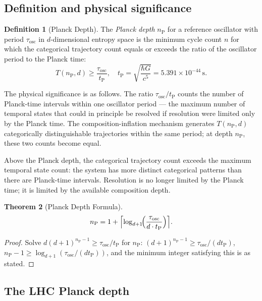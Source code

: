 \documentclass[twocolumn,10pt,a4paper]{article}
\theoremstyle{thmstyle}
\newtheorem{theorem}{Theorem}[section]
\theoremstyle{definition}
\newtheorem{definition}[theorem]{Definition}
\theoremstyle{remark}
\newcommand{\tP}{t_{\mathrm{P}}}
\newcommand{\nP}{n_{\mathrm{P}}}
\begin{document}
\subsection{Definition and physical significance}

\begin{definition}[Planck Depth]
\label{def:planckdepth}
The \emph{Planck depth} $\nP$ for a reference oscillator with period
$\tau_{\mathrm{osc}}$ in $d$-dimensional entropy space is the minimum cycle
count $n$ for which the categorical trajectory count equals or exceeds the
ratio of the oscillator period to the Planck time:
\begin{equation}
T(\nP, d) \geq \frac{\tau_{\mathrm{osc}}}{\tP},
\quad \tP = \sqrt{\frac{\hbar G}{c^5}} = 5.391 \times 10^{-44}\,\mathrm{s}.
\label{eq:planck_def}
\end{equation}
\end{definition}

The physical significance is as follows. The ratio $\tau_{\mathrm{osc}}/\tP$
counts the number of Planck-time intervals within one oscillator period —
the maximum number of temporal states that could in principle be resolved
if resolution were limited only by the Planck time. The composition-inflation
mechanism generates $T(\nP, d)$ categorically distinguishable trajectories
within the same period; at depth $\nP$, these two counts become equal.

Above the Planck depth, the categorical trajectory count exceeds the
maximum temporal state count: the system has more distinct categorical
patterns than there are Planck-time intervals. Resolution is no longer limited
by the Planck time; it is limited by the available composition depth.

\begin{theorem}[Planck Depth Formula]
\label{thm:planckformula}
\begin{equation}
\nP = 1 + \Bigl\lceil \log_{d+1}\!\Bigl(\frac{\tau_{\mathrm{osc}}}{d \cdot \tP}\Bigr)\Bigr\rceil.
\label{eq:planck_formula}
\end{equation}
\end{theorem}

\begin{proof}
Solve $d(d+1)^{\nP-1} \geq \tau_{\mathrm{osc}}/\tP$ for $\nP$:
$(d+1)^{\nP-1} \geq \tau_{\mathrm{osc}}/(d\tP)$,
$\nP - 1 \geq \log_{d+1}(\tau_{\mathrm{osc}}/(d\tP))$,
and the minimum integer satisfying this is as stated.
\end{proof}

\subsection{The LHC Planck depth}
\end{document}
